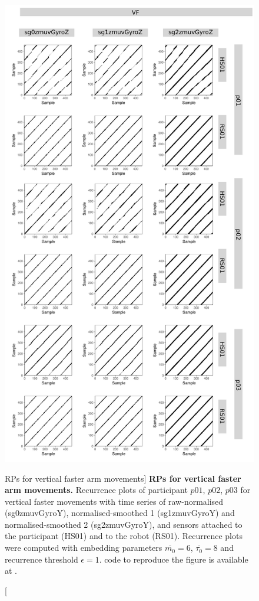 \begin{figure}
\centering
\includegraphics[height=0.80\textheight]{rp_VF}
\caption
	[RPs for vertical faster arm movements]{
	{\bf RPs for vertical faster arm movements.}	
	Recurrence plots %
	of participant $p01$, $p02$, $p03$ for vertical faster
	movements with time series of raw-normalised (sg0zmuvGyroY), 
	normalised-smoothed 1 (sg1zmuvGyroY) and 
	normalised-smoothed 2 (sg2zmuvGyroY), and 
	sensors attached to the participant (HS01) and to the robot (RS01).
	Recurrence plots were computed with 
	embedding parameters $\overline{m_0}=6$, $\overline{\tau_0}=8$ and
	recurrence threshold $\epsilon=1$.
	\R code to reproduce the figure is available at 
	.
        }
    \label{fig:rp_VF}
\end{figure}
